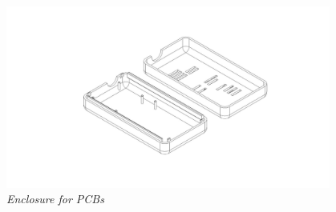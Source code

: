 \documentclass[8pt,compress,aspectratio=169]{beamer}
\begin{document}
\begin{frame}
\begin{minipage}{0.45\textwidth}
\begin{figure}
      \includegraphics[width=0.95\textwidth]{assets/electronic/psperi_enclosure_final_testpic2.jpg}
      \caption{\it Enclosure for PCBs}
    \end{figure}
  \end{minipage}
\end{frame}

\end{document}
